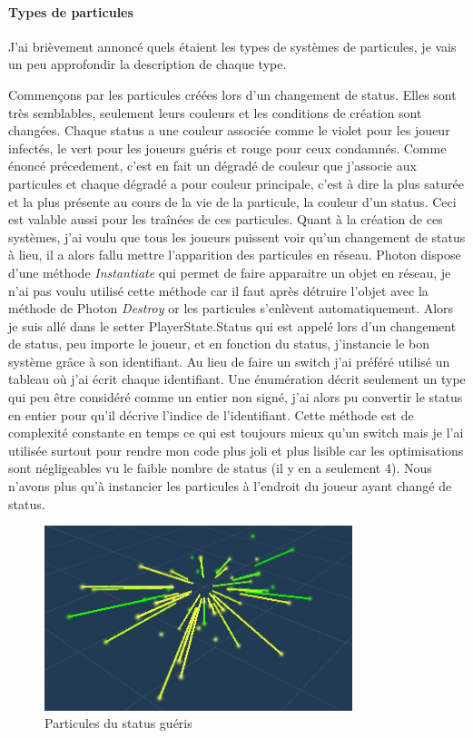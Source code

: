 \documentclass{article}
\begin{document}
\paragraph{Types de particules}

J'ai brièvement annoncé quels étaient les types de systèmes de particules, je vais un peu approfondir la description de chaque type.

Commençons par les particules créées lors d'un changement de status. Elles sont très semblables, seulement leurs couleurs et les conditions de création sont changées. Chaque status a une couleur associée comme le violet pour les joueur infectés, le vert pour les joueurs guéris et rouge pour ceux condamnés. Comme énoncé précedement, c'est en fait un dégradé de couleur que j'associe aux particules et chaque dégradé a pour couleur principale, c'est à dire la plus saturée et la plus présente au cours de la vie de la particule, la couleur d'un status. Ceci est valable aussi pour les traînées de ces particules. Quant à la création de ces systèmes, j'ai voulu que tous les joueurs puissent voir qu'un changement de status à lieu, il a alors fallu mettre l'apparition des particules en réseau. Photon dispose d'une méthode \emph{Instantiate} qui permet de faire apparaitre un objet en réseau, je n'ai pas voulu utilisé cette méthode car il faut après détruire l'objet avec la méthode de Photon \emph{Destroy} or les particules s'enlèvent automatiquement. Alors je suis allé dans le setter PlayerState.Status qui est appelé lors d'un changement de status, peu importe le joueur, et en fonction du status, j'instancie le bon système grâce à son identifiant. Au lieu de faire un switch j'ai préféré utilisé un tableau où j'ai écrit chaque identifiant. Une énumération décrit seulement un type qui peu être considéré comme un entier non signé, j'ai alors pu convertir le status en entier pour qu'il décrive l'indice de l'identifiant. Cette méthode est de complexité constante en temps ce qui est toujours mieux qu'un switch mais je l'ai utilisée surtout pour rendre mon code plus joli et plus lisible car les optimisations sont négligeables vu le faible nombre de status (il y en a seulement 4). Nous n'avons plus qu'à instancier les particules à l'endroit du joueur ayant changé de status.

\begin{figure}[H]
    \centering
    \includegraphics[width=0.8\textwidth]{cc/particles_healed.JPG}
    \caption{Particules du status guéris}
    \label{Particules du status guéris}
\end{figure}
\end{document}
